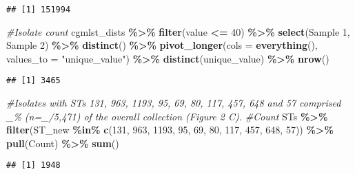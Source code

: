 \documentclass[
]{article}
\newenvironment{Shaded}{\begin{snugshade}}{\end{snugshade}}
\newcommand{\AttributeTok}[1]{\textcolor[rgb]{0.13,0.29,0.53}{#1}}
\newcommand{\CommentTok}[1]{\textcolor[rgb]{0.56,0.35,0.01}{\textit{#1}}}
\newcommand{\DecValTok}[1]{\textcolor[rgb]{0.00,0.00,0.81}{#1}}
\newcommand{\FunctionTok}[1]{\textcolor[rgb]{0.13,0.29,0.53}{\textbf{#1}}}
\newcommand{\NormalTok}[1]{#1}
\newcommand{\SpecialCharTok}[1]{\textcolor[rgb]{0.81,0.36,0.00}{\textbf{#1}}}
\newcommand{\StringTok}[1]{\textcolor[rgb]{0.31,0.60,0.02}{#1}}
\begin{document}
\begin{verbatim}
## [1] 151994
\end{verbatim}

\begin{Shaded}
\begin{Highlighting}[]
\CommentTok{\#Isolate count}
\NormalTok{cgmlst\_dists }\SpecialCharTok{\%\textgreater{}\%} \FunctionTok{filter}\NormalTok{(value }\SpecialCharTok{\textless{}=} \DecValTok{40}\NormalTok{) }\SpecialCharTok{\%\textgreater{}\%}
  \FunctionTok{select}\NormalTok{(}\StringTok{\textasciigrave{}}\AttributeTok{Sample 1}\StringTok{\textasciigrave{}}\NormalTok{, }\StringTok{\textasciigrave{}}\AttributeTok{Sample 2}\StringTok{\textasciigrave{}}\NormalTok{) }\SpecialCharTok{\%\textgreater{}\%}
  \FunctionTok{distinct}\NormalTok{() }\SpecialCharTok{\%\textgreater{}\%}
  \FunctionTok{pivot\_longer}\NormalTok{(}\AttributeTok{cols =} \FunctionTok{everything}\NormalTok{(), }\AttributeTok{values\_to =} \StringTok{"unique\_value"}\NormalTok{) }\SpecialCharTok{\%\textgreater{}\%}
  \FunctionTok{distinct}\NormalTok{(unique\_value) }\SpecialCharTok{\%\textgreater{}\%} \FunctionTok{nrow}\NormalTok{()}
\end{Highlighting}
\end{Shaded}

\begin{verbatim}
## [1] 3465
\end{verbatim}

\begin{Shaded}
\begin{Highlighting}[]
\CommentTok{\#Isolates with STs 131, 963, 1193, 95, 69, 80, 117, 457, 648 and 57 comprised \_\% (n=\_/5,471) of the overall collection (Figure 2 C). }
\CommentTok{\#Count}
\NormalTok{STs }\SpecialCharTok{\%\textgreater{}\%} \FunctionTok{filter}\NormalTok{(ST\_new }\SpecialCharTok{\%in\%} \FunctionTok{c}\NormalTok{(}\DecValTok{131}\NormalTok{, }\DecValTok{963}\NormalTok{, }\DecValTok{1193}\NormalTok{, }\DecValTok{95}\NormalTok{, }\DecValTok{69}\NormalTok{, }\DecValTok{80}\NormalTok{, }\DecValTok{117}\NormalTok{, }\DecValTok{457}\NormalTok{, }\DecValTok{648}\NormalTok{, }\DecValTok{57}\NormalTok{)) }\SpecialCharTok{\%\textgreater{}\%} \FunctionTok{pull}\NormalTok{(Count) }\SpecialCharTok{\%\textgreater{}\%} \FunctionTok{sum}\NormalTok{()}
\end{Highlighting}
\end{Shaded}

\begin{verbatim}
## [1] 1948
\end{verbatim}
\end{document}
